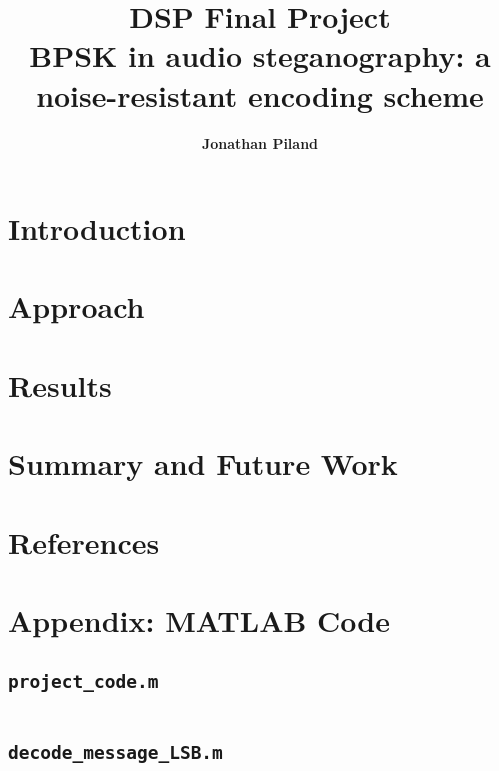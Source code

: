 \documentclass{article}
\title{\vspace{64pt} \bf{DSP Final Project} \\ \textnormal{BPSK in audio steganography: a noise-resistant encoding scheme}}
\author{\bf{Jonathan Piland}}
\date{\parbox{\linewidth}{\centering
  \endgraf\bigskip
  \classname\endgraf
  \classprof\endgraf\medskip
  Whiting School of Engineering \endgraf
Johns Hopkins University\endgraf\bigskip\displaydate{date}}}
\begin{document}
\maketitle

\newpage
\section{Introduction}

\section{Approach}

\section{Results}

\section{Summary and Future Work}

\section{References}

\newpage
\section{Appendix: MATLAB Code}
\subsection{\texttt{project\_code.m}}
\inputminted[xleftmargin=24pt, linenos=true, breaklines]{matlab}{project_code.m}


\subsection{\texttt{decode\_message\_LSB.m}}
\inputminted[xleftmargin=24pt, linenos=true, breaklines]{matlab}{project_code.m}
\end{document}
